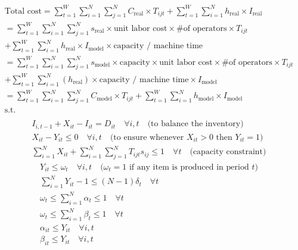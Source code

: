 \documentclass[10pt]{article}
\begin{document}
\begin{gather*}
    \text{Total cost} = \sum_{t = 1}^{W}\sum_{i = 1}^{N}\sum_{j = 1}^{N}C_{\text{real}}\times T_{ijt} + \sum_{t = 1}^{W}\sum_{i = 1}^{N}h_{\text{real}}\times I_{\text{real}}\\
    = \sum_{t = 1}^{W}\sum_{i = 1}^{N}\sum_{j = 1}^{N}s_{\text{real}}\times\text{unit labor cost}\times \text{\# of operators}\times T_{ijt}\\
    + \sum_{t = 1}^{W}\sum_{i = 1}^{N}h_{\text{real}}\times I_{\text{model}}\times\text{capacity / machine time }\\
    = \sum_{t = 1}^{W}\sum_{i = 1}^{N}\sum_{j = 1}^{N}s_{\text{model}}\times\text{capacity}\times\text{unit labor cost} \times\text{\# of operators}\times T_{ijt}\\
    + \sum_{t = 1}^{W}\sum_{i = 1}^{N} (h_{\text{real}})\times\text{capacity / machine time}\times I_{\text{model}}\\
    = \sum_{t = 1}^{W}\sum_{i = 1}^{N}\sum_{j = 1}^{N}C_{\text{model}}\times T_{ijt} + \sum_{t = 1}^{W}\sum_{i = 1}^{N}h_{\text{model}}\times I_{\text{model}}\\
    \text{s.t.}\\
\end{gather*}
\begin{gather}
    I_{i, t - 1} + X_{it} - I_{it} = D_{it}\quad\forall i, t\quad\text{(to balance the inventory)}\\
    X_{it} - Y_{it} \le 0\quad\forall i, t\quad\text{(to ensure whenever $X_{it} > 0 $ then $Y_{it} = 1$)}\\
    \sum_{i = 1}^{N}X_{it} + \sum_{i = 1}^{N}\sum_{j = 1}^{N}T_{ijt}s_{ij}\le 1\quad\forall t\quad\text{(capacity constraint)}
\end{gather}
\begin{gather}
    Y_{it} \le\omega_t\quad\forall i, t\quad\text{($\omega_t = 1 $ if any item is produced in period $t $)}\\
    \sum_{i = 1}^{N}Y_{it} - 1\le (N - 1)\delta_t\quad\forall t\\
    \omega_t\le\sum_{i = 1}^{N}\alpha_t\le 1\quad\forall t\\
    \omega_t\le\sum_{i = 1}^{N}\beta_t\le 1\quad\forall t\\
    \alpha_{it}\le Y_{it}\quad\forall i, t\\
    \beta_{it}\le Y_{it}\quad\forall i, t
\end{gather}
\end{document}
